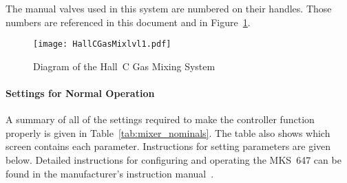 The manual valves used in this system are numbered on their
handles.  Those numbers are referenced in this document and in
Figure~\ref{fig:gas_mix}.
\begin{figure}
\texttt{[image: HallCGasMixlvl1.pdf]}
\caption{Diagram of the Hall~C Gas Mixing System\label{fig:gas_mix}}
\end{figure}

\paragraph{Settings for Normal Operation}

A summary of all of the settings required to make the controller
function properly is given in Table~\ref{tab:mixer_nominals}. The
table also shows which screen contains each parameter. Instructions
for setting parameters are given below. Detailed instructions for
configuring and operating the MKS~647 can be found in the
manufacturer's instruction manual~\cite{647C_EN_0504A1}.

